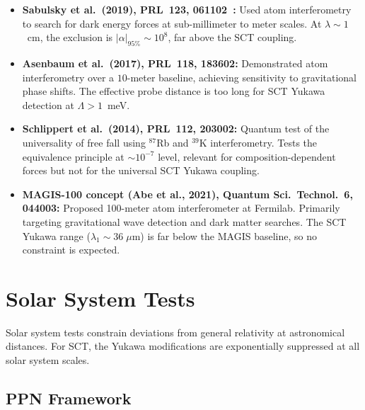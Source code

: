 \documentclass[11pt,a4paper]{article}
\begin{document}
\begin{itemize}[leftmargin=2em]
  \item \textbf{Sabulsky et al.\ (2019), PRL~123, 061102~\cite{sabulsky2019}:}
    Used atom interferometry to search for dark energy forces at sub-millimeter
    to meter scales. At $\lambda \sim 1$~cm, the exclusion is
    $|\alpha|_{\text{95\%}} \sim 10^8$, far above the SCT coupling.

  \item \textbf{Asenbaum et al.\ (2017), PRL~118, 183602:}
    Demonstrated atom interferometry over a $10$-meter baseline, achieving
    sensitivity to gravitational phase shifts. The effective probe distance
    is too long for SCT Yukawa detection at $\Lambda > 1$~meV.

  \item \textbf{Schlippert et al.\ (2014), PRL~112, 203002:}
    Quantum test of the universality of free fall using ${}^{87}$Rb and
    ${}^{39}$K interferometry. Tests the equivalence principle at
    $\sim 10^{-7}$ level, relevant for composition-dependent forces but not
    for the universal SCT Yukawa coupling.

  \item \textbf{MAGIS-100 concept (Abe et al., 2021),
    Quantum Sci.\ Technol.~6, 044003:}
    Proposed 100-meter atom interferometer at Fermilab. Primarily targeting
    gravitational wave detection and dark matter searches. The SCT Yukawa
    range ($\lambda_1 \sim 36\;\mu$m) is far below the MAGIS baseline,
    so no constraint is expected.
\end{itemize}

\section{Solar System Tests}
\label{sec:solar-system}

Solar system tests constrain deviations from general relativity at
astronomical distances. For SCT, the Yukawa modifications are exponentially
suppressed at all solar system scales.

\subsection{PPN Framework}
\end{document}
